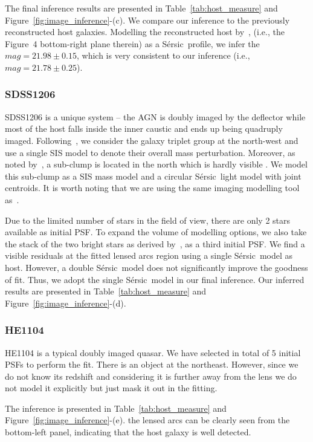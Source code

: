 \documentclass[fleqn,usenatbib]{mnras}
\newcommand{\sersic}{S\'ersic}
\begin{document}
The final inference results are presented in Table~\ref{tab:host_measure} and Figure~\ref{fig:image_inference}-(c). We compare our inference to the previously reconstructed host galaxies. Modelling the reconstructed host by~\citet{Rusu2019}, (i.e., the Figure~4 bottom-right plane therein) as a \sersic\ profile, we infer the $mag = 21.98 \pm 0.15$, which is very consistent to our inference (i.e., $mag = 21.78 \pm 0.25$).

\subsubsection{SDSS1206}
SDSS1206 is a unique system -- the AGN is doubly imaged by the deflector while most of the host falls inside the inner caustic and ends up being quadruply imaged. Following~\citet{Birrer2019}, we consider the galaxy triplet group at the north-west and use a single SIS model to denote their overall mass perturbation. Moreover, as noted by~\citet{Birrer2019}, a sub-clump is located in the north which is hardly visible \citep[see Figure~1 in][]{Birrer2019}. We model this sub-clump as a SIS mass model and a circular \sersic\ light model with joint centroids. It is worth noting that we are using the same imaging modelling tool as~\citet{Birrer2019}.

Due to the limited number of stars in the field of view, there are only 2 stars available as initial PSF. To expand the volume of modelling options, we also take the stack of the two bright stars as derived by~\citet{Birrer2019}, as a third initial PSF. We find a visible residuals at the fitted lensed arcs region using a single \sersic\ model as host. However, a double \sersic\ model does not significantly improve the goodness of fit. Thus, we adopt the single \sersic\ model in our final inference. Our inferred results are presented in Table~\ref{tab:host_measure} and Figure~\ref{fig:image_inference}-(d).


\subsubsection{HE1104}
HE1104 is a typical doubly imaged quasar. We have selected in total of 5 initial PSFs to perform the fit. There is an object at the northeast. However, since we do not know its redshift and considering it is further away from the lens we do not model it explicitly but just mask it out in the fitting.

The inference is presented in Table~\ref{tab:host_measure} and Figure~\ref{fig:image_inference}-(e). the lensed arcs can be clearly seen from the bottom-left panel, indicating that the host galaxy is well detected.
\end{document}
